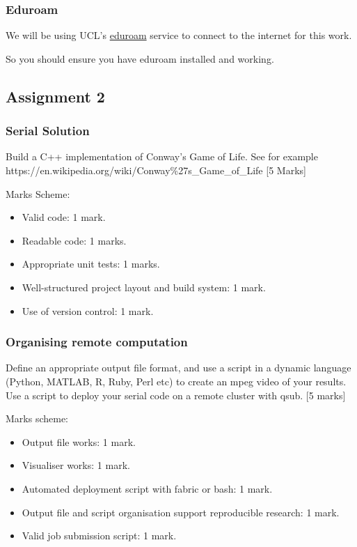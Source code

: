 \subsubsection{Eduroam}\label{eduroam}

We will be using UCL's
\href{http://www.ucl.ac.uk/isd/staff/wireless/eduroam}{eduroam} service
to connect to the internet for this work.

So you should ensure you have eduroam installed and working.

\subsection{Assignment 2}\label{assignment-2}

\subsubsection{Serial Solution}\label{serial-solution}

Build a C++ implementation of Conway's Game of Life. See for example
https://en.wikipedia.org/wiki/Conway\%27s\_Game\_of\_Life {[}5 Marks{]}

Marks Scheme:

\begin{itemize}
\itemsep1pt\parskip0pt
\item
  Valid code: 1 mark.
\item
  Readable code: 1 marks.
\item
  Appropriate unit tests: 1 marks.
\item
  Well-structured project layout and build system: 1 mark.
\item
  Use of version control: 1 mark.
\end{itemize}

\subsubsection{Organising remote
computation}\label{organising-remote-computation}

Define an appropriate output file format, and use a script in a dynamic
language (Python, MATLAB, R, Ruby, Perl etc) to create an mpeg video of
your results. Use a script to deploy your serial code on a remote
cluster with qsub. {[}5 marks{]}

Marks scheme:

\begin{itemize}
\itemsep1pt\parskip0pt
\item
  Output file works: 1 mark.
\item
  Visualiser works: 1 mark.
\item
  Automated deployment script with fabric or bash: 1 mark.
\item
  Output file and script organisation support reproducible research: 1
  mark.
\item
  Valid job submission script: 1 mark.
\end{itemize}

